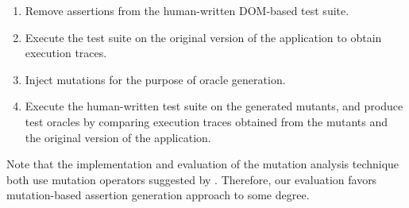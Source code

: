 \begin{enumerate}
\item Remove assertions from the human-written DOM-based test suite.
\item Execute the test suite on the original version of the application to obtain execution traces.
\item Inject mutations for the purpose of oracle generation.
\item Execute the human-written test suite on the generated mutants, and produce test oracles by comparing execution traces obtained from the mutants and the original version of the application.
\end{enumerate}
Note that the implementation and evaluation of the mutation analysis technique both use mutation operators suggested by \cite{mirshokraie:tse15}. Therefore, our evaluation favors mutation-based assertion generation approach to some degree. 

